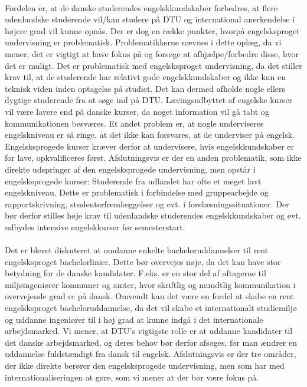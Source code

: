\\
Fordelen er, at de danske studerendes engelskkundskaber forbedres, at flere udenlandske studerende vil/kan studere på DTU og international anerkendelse i højere grad vil kunne opnås. Der er dog en række punkter, hvorpå engelsksproget undervisning er problematisk. Problematikkerne nævnes i dette oplæg, da vi mener, det er vigtigt at have fokus på og forsøge at afhjælpe/forbedre disse, hvor det er muligt. Det er problematisk med engelsksproget undervisning, da det stiller krav til, at de studerende har relativt gode engelskkundskaber og ikke kun en teknisk viden inden optagelse på studiet. Det kan dermed afholde nogle ellers dygtige studerende fra at søge ind på DTU. Læringsudbyttet af engelske kurser vil være lavere end på danske kurser, da noget information vil gå tabt og kommunikationen besværes. Et andet problem er, at nogle underviseres engelskniveau er så ringe, at det ikke kan forsvares, at de underviser på engelsk. Engelsksprogede kurser kræver derfor at undervisere, hvis engelskkundskaber er for lave, opkvalificeres først. Afslutningsvis er der en anden problematik, som ikke direkte udspringer af den engelsksprogede undervisning, men opstår i engelsksprogede kurser: Studerende fra udlandet har ofte et meget lavt engelskniveau. Dette er problematisk i forbindelse med gruppearbejde og rapportskrivning, studenterfremlæggelser og evt. i forelæsningssituationer. Der bør derfor stilles høje krav til udenlandske studerendes engelskkundskaber og evt. udbydes intensive engelskkurser før
semesterstart. \\
\\
Det er blevet diskuteret at omdanne enkelte bacheloruddannelser til rent engelsksproget bachelorlinier. Dette bør overvejes nøje, da det kan have stor betydning for de danske kandidater. F.eks. er en stor del af aftagerne til miljøingeniører kommuner og amter, hvor skriftlig og mundtlig kommunikation i overvejende grad er på dansk. Omvendt kan det være en fordel at skabe en rent engelsksproget bacheloruddannelse, da det vil skabe et internationalt studiemiljø og uddanne ingeniører til i høj grad at kunne indgå i det internationale arbejdsmarked. Vi mener, at DTU’s vigtigste rolle er at uddanne kandidater til det danske arbejdsmarked, og deres behov bør derfor afsøges, før man ændrer en uddannelse fuldstændigt fra dansk til engelsk. Afslutningsvis er der tre områder, der ikke direkte berører den engelsksprogede undervisning, men som har med internationaliseringen at gøre, som vi mener at der bør være fokus på. \\
